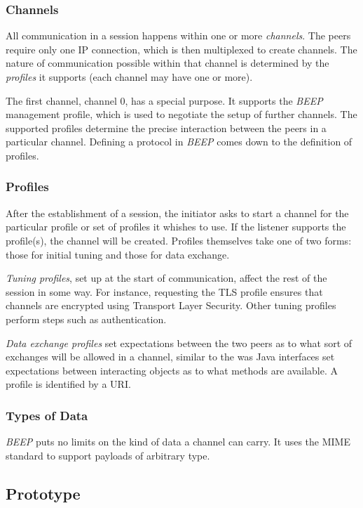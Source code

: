\subsubsection{Channels}
All communication in a session happens within one or more \emph{channels}. The peers require only one IP connection, which is then multiplexed to create channels. The nature of communication possible within that channel is determined by the \emph{profiles} it supports (each channel may have one or more).

The first channel, channel 0, has a special purpose. It supports the \emph{BEEP} management profile, which is used to negotiate the setup of further channels. The supported profiles determine the precise interaction between the peers in a particular channel. Defining a protocol in \emph{BEEP} comes down to the definition of profiles.

\subsubsection{Profiles}
After the establishment of a session, the initiator asks to start a channel for the particular profile or set of profiles it whishes to use. If the listener supports the profile(s), the channel will be created. Profiles themselves take one of two forms: those for initial tuning and those for data exchange.

\emph{Tuning profiles}, set up at the start of communication, affect the rest of the session in some way. For instance, requesting the TLS profile ensures that channels are encrypted using Transport Layer Security. Other tuning profiles perform steps such as authentication.

\emph{Data exchange profiles} set expectations between the two peers as to what sort of exchanges will be allowed in a channel, similar to the was Java interfaces set expectations between interacting objects as to what methods are available. A profile is identified by a URI.

\subsubsection{Types of Data}
\emph{BEEP} puts no limits on the kind of data a channel can carry. It uses the MIME standard to support payloads of arbitrary type.



\subsection{Prototype}
